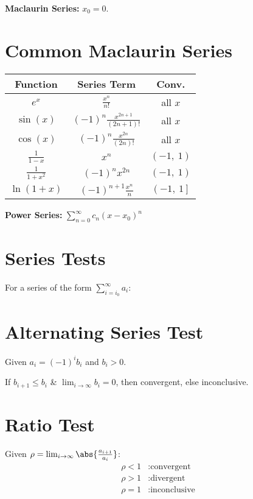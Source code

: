\documentclass{article}
\begin{document}
\begin{multicols}{3}
    \textbf{Maclaurin Series:} \(x_0 = 0\).
    \section*{Common Maclaurin Series}
    \begin{table}[H]
        \centering
        \begin{tabular}{c c c}
            \toprule
            \textbf{Function}         & \textbf{Series Term}                                        & \textbf{Conv.}           \\
            \midrule
            \(e^{x}\)                  & \(\frac{x^n}{n!}\)                                            & all \(x\)                  \\
            \(\sin{\left( x \right)}\)  & \(\left( -1 \right)^n \frac{x^{2n+1}}{\left( 2n+1 \right)!}\) & all \(x\)                  \\
            \(\cos{\left( x \right)}\)  & \(\left( -1 \right)^n \frac{x^{2n}}{\left( 2n \right)!}\)     & all \(x\)                  \\
            \(\frac{1}{1-x}\)           & \(x^n\)                                                       & \(\left( -1,\: 1 \right)\) \\
            \(\frac{1}{1+x^2}\)         & \(\left( -1 \right)^n x^{2n}\)                                & \(\left( -1,\: 1 \right)\) \\
            \(\ln{\left( 1+x \right)}\) & \(\left( -1 \right)^{n+1} \frac{x^n}{n}\)                     & \(\left( -1,\: 1 \right]\) \\
            \bottomrule
        \end{tabular}
    \end{table}
    \textbf{Power Series:} \(\sum_{n=0}^{\infty} c_n\left( x-x_0 \right)^n\)
    \section*{Series Tests}
    For a series of the form \(\displaystyle\sum_{i=i_0}^\infty a_i\):
    \section*{Alternating Series Test}
    Given \(a_i = \left( -1 \right)^i b_i\) and \(b_i>0\).

    If \(b_{i+1}\leqslant b_i\) \& \(\lim_{i\to\infty}b_i=0\), then
    convergent, else inconclusive.
    \section*{Ratio Test}
    Given \(\rho = \lim_{i\to\infty}\abs{\frac{a_{i+1}}{a_i}}\):
    \begin{align*}
        \rho < 1 & : \text{convergent}   \\
        \rho > 1 & : \text{divergent}    \\
        \rho = 1 & : \text{inconclusive}
    \end{align*}

\end{multicols}
\end{document}
